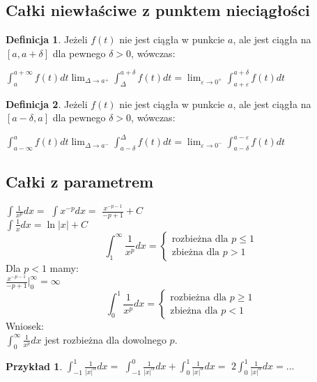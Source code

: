 \documentclass{article}
\theoremstyle{definition}
\newtheorem{de}{Definicja}[subsection]
\theoremstyle{definition}
\theoremstyle{definition}
\newtheorem{pk}{Przykład}[subsection]
\theoremstyle{definition}
\begin{document}
\subsection{Całki niewłaściwe z punktem nieciągłości}

\begin{de}
    Jeżeli $f(t)$ nie jest ciągła w punkcie $a$, ale jest ciągła na $[a, a+\delta]$ dla pewnego $\delta>0$, wówczas:
    \begin{center}
        $\int_{a}^{a+\infty} f(t) dt \lim_{\Delta \rightarrow a^+} \int_{\Delta}^{a+\delta} f(t) dt=\lim_{\varepsilon \rightarrow 0^+} \int_{a+\varepsilon}^{a+\delta} f(t)dt$
    \end{center}
\end{de}

\begin{de}
    Jeżeli $f(t)$ nie jest ciągła w punkcie $a$, ale jest ciągła na $[a-\delta, a]$ dla pewnego $\delta>0$, wówczas:
    \begin{center}
        $\int_{a-\infty}^{a} f(t) dt \lim_{\Delta \rightarrow a^-} \int_{a-\delta}^{\Delta} f(t) dt=\lim_{\varepsilon \rightarrow 0^-} \int_{a-\delta}^{a-\varepsilon} f(t)dt$
    \end{center}
\end{de}

\subsection{Całki z parametrem}

$\int \frac{1}{x^p}dx=$
$\int x^{-p} dx=$
$\frac{x^{-p-1}}{-p+1} + C$\\
$\int \frac{1}{x} dx = \ln|x| + C$\\
$$\int_{1}^{\infty} \frac{1}{x^p} dx =
\begin{cases}
    \text{rozbieżna dla } p\leq 1\\
    \text{zbieżna dla } p>1
\end{cases}
$$
Dla $p<1$ mamy:\\
$\frac{x^{-p-1}}{-p+1} |_{0}^{\infty} = \infty$
$$
\int_{0}^{1} \frac{1}{x^p} dx =
\begin{cases}
    \text{rozbieżna dla } p\geq 1\\
    \text{zbieżna dla } p<1
\end{cases}
$$
Wniosek:\\
$\int_{0}^{\infty} \frac{1}{x^p} dx$ jest rozbieżna dla dowolnego $p$.

\begin{pk}
    $\int_{-1}^{1} \frac{1}{|x|^{\alpha}} dx=$
    $\int_{-1}^{0} \frac{1}{|x|^{\alpha}} dx + \int_{0}^{1} \frac{1}{|x|^{\alpha}} dx=$
    $2\int_{0}^{1} \frac{1}{|x|^{\alpha}} dx=...$
\end{pk}
\end{document}
